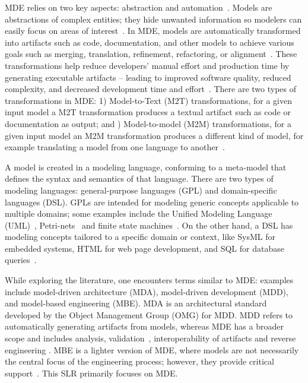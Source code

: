 MDE relies on two key aspects: abstraction and automation~\cite{mohagheghi2009mde}. Models are abstractions of complex entities; they hide unwanted information so modelers can easily focus on areas of interest~\cite{schmidt2006model, brambilla2017model}. 
In MDE, models are automatically transformed into artifacts such as code, documentation, and other models to achieve various goals such as merging, translation, refinement, refactoring, or alignment~\cite{brambilla2017model}. These transformations help reduce developers' manual effort and production time by generating executable artifacts -- leading to improved software quality, reduced complexity, and decreased development time and effort~\cite{kelly2008domain}. There are two types of transformations in MDE: 1) Model-to-Text (M2T) transformations, for a given input model a M2T transformation produces a textual artifact such as code or documentation as output; and ) Model-to-model (M2M) transformations, for a given input model an M2M transformation produces a different kind of model, for example translating a model from one language to another~\cite{brambilla2017model}.

A model is created in a modeling language, conforming to a meta-model that defines the syntax and semantics of that language. There are two types of modeling languages: general-purpose languages (GPL) and domain-specific languages (DSL). GPLs are intended for modeling generic concepts applicable to multiple domains; some examples include the Unified Modeling Language (UML)~\cite{eriksson2003uml}, Petri-nets~\cite{peterson1977petri} and finite state machines~\cite{wagner2006modeling}. On the other hand, a DSL has modeling concepts tailored to a specific domain or context, like SysML for embedded systems, HTML for web page development, and SQL for database queries~\cite{brambilla2017model}.

While exploring the literature, one encounters terms similar to MDE: examples include model-driven architecture (MDA), model-driven development (MDD), and model-based engineering (MBE). MDA is an architectural standard~\cite{mda} developed by the Object Management Group (OMG) \cite{omg} for MDD. MDD refers to automatically generating artifacts from models, whereas MDE has a broader scope and includes analysis, validation~\cite{almonte2021recommender}, interoperability of artifacts and reverse engineering \cite{brambilla2017model}. MBE is a lighter version of MDE, where models are not necessarily the central focus of the engineering process; however, they provide critical support~\cite{brambilla2017model}. This SLR primarily focuses on MDE.

